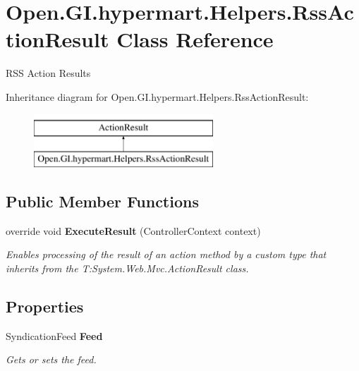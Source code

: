 \section{Open.\+G\+I.\+hypermart.\+Helpers.\+Rss\+Action\+Result Class Reference}
\label{class_open_1_1_g_i_1_1hypermart_1_1_helpers_1_1_rss_action_result}


R\+SS Action Results  


Inheritance diagram for Open.\+G\+I.\+hypermart.\+Helpers.\+Rss\+Action\+Result\+:\begin{figure}[H]
\begin{center}
\leavevmode
\includegraphics[height=2.000000cm]{class_open_1_1_g_i_1_1hypermart_1_1_helpers_1_1_rss_action_result}
\end{center}
\end{figure}
\subsection*{Public Member Functions}
\begin{DoxyCompactItemize}
\item 
override void \textbf{ Execute\+Result} (Controller\+Context context)
\begin{DoxyCompactList}\small\item\em Enables processing of the result of an action method by a custom type that inherits from the T\+:\+System.\+Web.\+Mvc.\+Action\+Result class. \end{DoxyCompactList}\end{DoxyCompactItemize}
\subsection*{Properties}
\begin{DoxyCompactItemize}
\item 
Syndication\+Feed \textbf{ Feed}\hspace{0.3cm}{\ttfamily  [get, set]}
\begin{DoxyCompactList}\small\item\em Gets or sets the feed. \end{DoxyCompactList}\end{DoxyCompactItemize}


